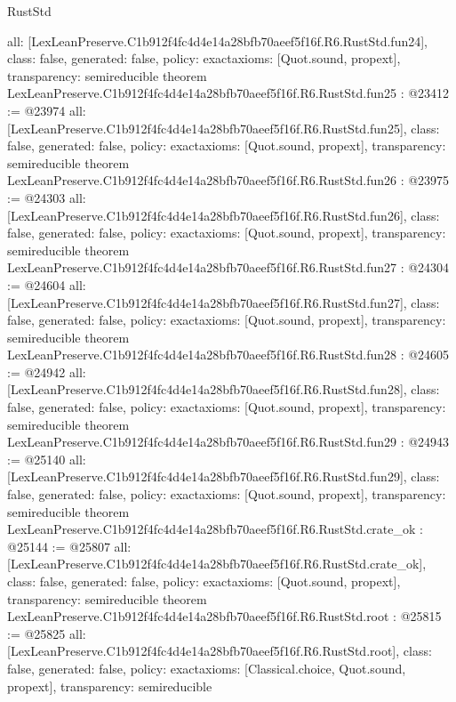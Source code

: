\begin{lexlean}{RustStd}
\begin{coremodule}
{  all: [LexLeanPreserve.C1b912f4fc4d4e14a28bfb70aeef5f16f.R6.RustStd.fun24],
  class: false,
  generated: false,
  policy: exact{axioms: [Quot.sound, propext]},
  transparency: semireducible
}
theorem LexLeanPreserve.C1b912f4fc4d4e14a28bfb70aeef5f16f.R6.RustStd.fun25 : @23412 := @23974 {
  all: [LexLeanPreserve.C1b912f4fc4d4e14a28bfb70aeef5f16f.R6.RustStd.fun25],
  class: false,
  generated: false,
  policy: exact{axioms: [Quot.sound, propext]},
  transparency: semireducible
}
theorem LexLeanPreserve.C1b912f4fc4d4e14a28bfb70aeef5f16f.R6.RustStd.fun26 : @23975 := @24303 {
  all: [LexLeanPreserve.C1b912f4fc4d4e14a28bfb70aeef5f16f.R6.RustStd.fun26],
  class: false,
  generated: false,
  policy: exact{axioms: [Quot.sound, propext]},
  transparency: semireducible
}
theorem LexLeanPreserve.C1b912f4fc4d4e14a28bfb70aeef5f16f.R6.RustStd.fun27 : @24304 := @24604 {
  all: [LexLeanPreserve.C1b912f4fc4d4e14a28bfb70aeef5f16f.R6.RustStd.fun27],
  class: false,
  generated: false,
  policy: exact{axioms: [Quot.sound, propext]},
  transparency: semireducible
}
theorem LexLeanPreserve.C1b912f4fc4d4e14a28bfb70aeef5f16f.R6.RustStd.fun28 : @24605 := @24942 {
  all: [LexLeanPreserve.C1b912f4fc4d4e14a28bfb70aeef5f16f.R6.RustStd.fun28],
  class: false,
  generated: false,
  policy: exact{axioms: [Quot.sound, propext]},
  transparency: semireducible
}
theorem LexLeanPreserve.C1b912f4fc4d4e14a28bfb70aeef5f16f.R6.RustStd.fun29 : @24943 := @25140 {
  all: [LexLeanPreserve.C1b912f4fc4d4e14a28bfb70aeef5f16f.R6.RustStd.fun29],
  class: false,
  generated: false,
  policy: exact{axioms: [Quot.sound, propext]},
  transparency: semireducible
}
theorem LexLeanPreserve.C1b912f4fc4d4e14a28bfb70aeef5f16f.R6.RustStd.crate_ok : @25144 := @25807 {
  all: [LexLeanPreserve.C1b912f4fc4d4e14a28bfb70aeef5f16f.R6.RustStd.crate_ok],
  class: false,
  generated: false,
  policy: exact{axioms: [Quot.sound, propext]},
  transparency: semireducible
}
theorem LexLeanPreserve.C1b912f4fc4d4e14a28bfb70aeef5f16f.R6.RustStd.root : @25815 := @25825 {
  all: [LexLeanPreserve.C1b912f4fc4d4e14a28bfb70aeef5f16f.R6.RustStd.root],
  class: false,
  generated: false,
  policy: exact{axioms: [Classical.choice, Quot.sound, propext]},
  transparency: semireducible
}


\end{coremodule}
\end{lexlean}

